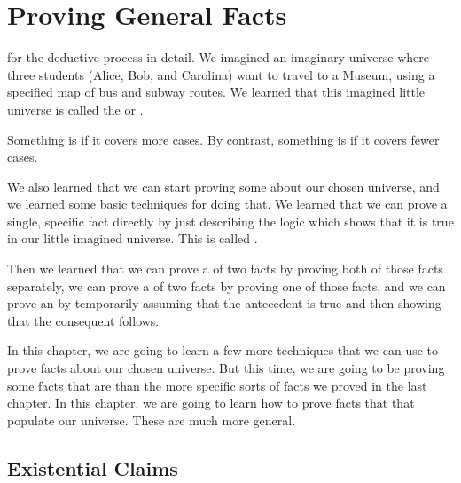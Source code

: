 \documentclass[../../../main.tex]{subfiles}
\begin{document}
\chapter{Proving General Facts}

 for the deductive process in detail. We imagined an imaginary universe where three students (Alice, Bob, and Carolina) want to travel to a Museum, using a specified map of bus and subway routes. We learned that this imagined little universe is called the  or . 

\begin{terminology}
  Something is  if it covers more cases. By contrast, something is  if it covers fewer cases.
\end{terminology}

We also learned that we can start proving some  about our chosen universe, and we learned some basic techniques for doing that. We learned that we can prove a single, specific fact directly by just describing the logic which shows that it is true in our little imagined universe. This is called .

Then we learned that we can prove a  of two facts by proving both of those facts separately, we can prove a  of two facts by proving one of those facts, and we can prove an  by temporarily assuming that the antecedent is true and then showing that the consequent follows.

In this chapter, we are going to learn a few more techniques that we can use to prove facts about our chosen universe. But this time, we are going to be proving some facts that are  than the more specific sorts of facts we proved in the last chapter. In this chapter, we are going to learn how to prove facts that  that populate our universe. These are much more general.


\section{Existential Claims}
\end{document}
